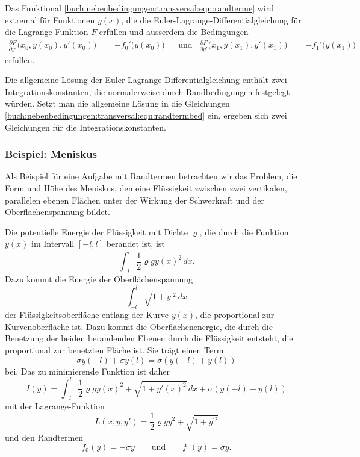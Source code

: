 \begin{satz}
\label{buch:nebenbedingungen:transversal:satz:randterme}
Das Funktional
\eqref{buch:nebenbedingungen:transversal:eqn:randterme}
wird extremal für Funktionen $y(x)$, die die
Euler-La\-gran\-ge-Differentialgleichung für die Lagrange-Funktion $F$ erfüllen
und ausserdem die Bedingungen
\begin{align}
\frac{\partial F}{\partial y'}\bigl(x_0,y(x_0),y'(x_0)) &= -f_0'(y(x_0)\bigr)
&&\text{und}&
\frac{\partial F}{\partial y'}\bigl(x_1,y(x_1),y'(x_1)) &= -f_1'(y(x_1)\bigr)
\label{buch:nebenbedingungen:transversal:eqn:randtermbed}
\end{align}
erfüllen.
\end{satz}

Die allgemeine Lösung der Euler-Lagrange-Differentialgleichung
enthält zwei Integrationskonstanten, die normalerweise durch
Randbedingungen festgelegt würden.
Setzt man die allgemeine Lösung in die Gleichungen
\eqref{buch:nebenbedingungen:transversal:eqn:randtermbed}
ein, ergeben sich zwei Gleichungen für die Integrationskonstanten.

%
%
\subsubsection{Beispiel: Meniskus}
Als Beispiel für eine Aufgabe mit Randtermen betrachten wir das
Problem, die Form und Höhe des Meniskus, den eine Flüssigkeit zwischen
zwei vertikalen, parallelen ebenen Flächen unter der Wirkung der
Schwerkraft und der Oberflächenspannung bildet.

Die potentielle Energie der Flüssigkeit mit Dichte $\varrho$, die 
durch die Funktion $y(x)$ im Intervall $[-l,l]$ berandet ist, ist
\[
\int_{-l}^l
\frac12
\varrho
g
y(x)^2
\,dx.
\]
Dazu kommt die Energie der Oberflächenspannung
\[
\int_{-l}^l \sqrt{1+y^{\prime 2}}\,dx
\]
der Flüssigkeitsoberfläche entlang der Kurve $y(x)$, die 
proportional zur Kurvenoberfläche ist.
Dazu kommt die Oberflächenenergie, die durch die Benetzung der
beiden berandenden Ebenen durch die Flüssigkeit entsteht, die
proportional zur benetzten Fläche ist. 
Sie trägt einen Term
\[
\sigma y(-l) + \sigma y(l)
=
\sigma(y(-l)+y(l))
\]
bei.
Das zu minimierende Funktion ist daher
\[
I(y)
=
\int_{-l}^l
\frac12\varrho g y(x)^2
+
\sqrt{1+y'(x)^2}
\,dx
+
\sigma(y(-l)+y(l))
\]
mit der Lagrange-Funktion
\[
L(x,y,y')
=
\frac12\varrho g y^2
+
\sqrt{1+y^{\prime 2}}
\]
und den Randtermen
\[
f_0(y) = -\sigma y
\qquad\text{und}\qquad
f_1(y) = \sigma y.
\]

